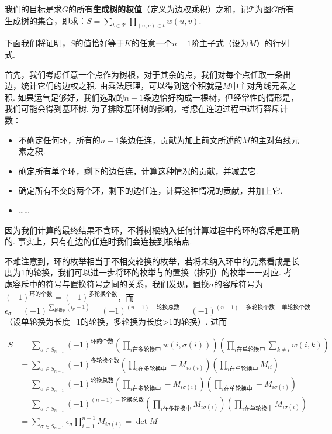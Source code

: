 我们的目标是求$G$的所有\textbf{生成树的权值}（定义为边权乘积）之和，记$\mathcal{T}$为图$G$所有生成树的集合，即求：$S=\sum\limits_{t\in \mathcal{T}}\prod\limits_{(u,v)\in t}w(u,v)$.

下面我们将证明，$S$的值恰好等于$K$的任意一个$n-1$阶主子式（设为$M$）的行列式.

首先，我们考虑任意一个点作为树根，对于其余的点，我们对每个点任取一条出边，统计它们的边权之积. 由乘法原理，可以得到这个积就是$M$中主对角线元素之积. 如果运气足够好，我们选取的$n-1$条边恰好构成一棵树，但经常性的情形是，我们可能会得到基环树. 为了排除基环树的影响，考虑在连边过程中进行容斥计数：

\begin{itemize}
	\item 不确定任何环，所有的$n-1$条边任连，贡献为加上前文所述的$M$的主对角线元素之积.
	\item 确定所有单个环，剩下的边任连，计算这种情况的贡献，并减去它.
	\item 确定所有不交的两个环，剩下的边任连，计算这种情况的贡献，并加上它.
	\item ……
\end{itemize}

因为我们计算的最终结果不含环，不将树根纳入任何计算过程中的环的容斥是正确的. 事实上，只有在边的任连时我们会连接到根结点.

不难注意到，环的枚举相当于不相交轮换的枚举，若将未纳入环中的元素看成是长度为1的轮换，我们可以进一步将环的枚举与的置换（排列）的枚举一一对应. 考虑容斥中的符号与置换符号之间的关系，我们发现，置换$\sigma$的容斥符号为$(-1)^{\text{环的个数}}=(-1)^{\text{多轮换个数}}$，而$\epsilon_{\sigma}=(-1)^{\sum_{\text{轮换}p}(l_p-1)}=(-1)^{(n-1)-\text{轮换总数}}=(-1)^{(n-1)-\text{多轮换个数}-\text{单轮换个数}}$（设单轮换为长度=1的轮换，多轮换为长度>1的轮换）. 进而

\begin{equation}
	\begin{split}
		S&=\sum\limits_{\sigma\in S_{n-1}}(-1)^{\text{环的个数}}(\prod\limits_{i\text{在多轮换中}}w(i,\sigma(i)))(\prod\limits_{i\text{在单轮换中}}\sum\limits_{k\neq i}w(i,k))\\
		&=\sum\limits_{\sigma\in S_{n-1}}(-1)^{\text{多轮换个数}}(\prod\limits_{i\text{在多轮换中}}-M_{i\sigma(i)})(\prod\limits_{i\text{在单轮换中}}M_{ii})\\
		&=\sum\limits_{\sigma\in S_{n-1}}(-1)^{\text{轮换总数}}(\prod\limits_{i\text{在多轮换中}}-M_{i\sigma(i)})(\prod\limits_{i\text{在单轮换中}}-M_{i\sigma(i)})\\
		&=\sum\limits_{\sigma\in S_{n-1}}(-1)^{(n-1)-\text{轮换总数}}(\prod\limits_{i\text{在多轮换中}}M_{i\sigma(i)})(\prod\limits_{i\text{在单轮换中}}M_{i\sigma(i)})\\
		&=\sum\limits_{\sigma\in S_{n-1}}\epsilon_{\sigma}\prod\limits_{i=1}^{n-1}M_{i\sigma(i)}=\det M
	\end{split}
\end{equation}

